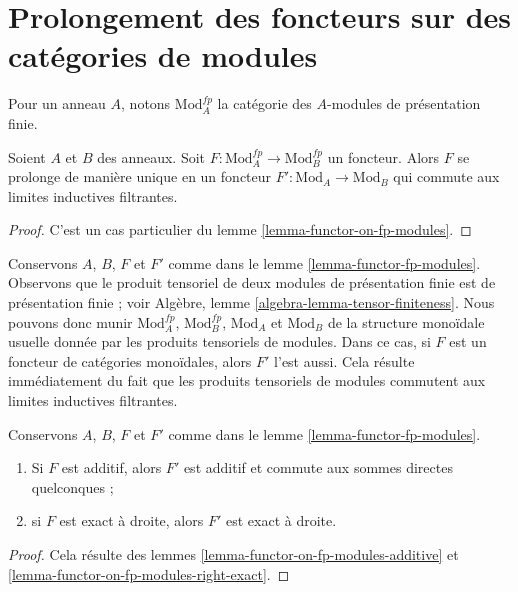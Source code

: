 \section{Prolongement des foncteurs sur des catégories de modules}
\label{section-functors-extend}

\noindent
Pour un anneau $A$, notons $\text{Mod}^{fp}_A$ la catégorie des
$A$-modules de présentation finie.

\begin{lemma}
\label{lemma-functor-fp-modules}
Soient $A$ et $B$ des anneaux. Soit
$F : \text{Mod}^{fp}_A \to \text{Mod}^{fp}_B$ un foncteur.
Alors $F$ se prolonge de manière unique en un foncteur
$F' : \text{Mod}_A \to \text{Mod}_B$
qui commute aux limites inductives filtrantes.
\end{lemma}

\begin{proof}
C'est un cas particulier du lemme \ref{lemma-functor-on-fp-modules}.
\end{proof}

\begin{remark}
\label{remark-monoidal-extension}
Conservons $A$, $B$, $F$ et $F'$ comme dans le lemme \ref{lemma-functor-fp-modules}.
Observons que le produit tensoriel de deux modules de présentation finie est
de présentation finie ; voir Algèbre, lemme \ref{algebra-lemma-tensor-finiteness}.
Nous pouvons donc munir $\text{Mod}^{fp}_A$, $\text{Mod}^{fp}_B$,
$\text{Mod}_A$ et $\text{Mod}_B$ de la structure monoïdale usuelle
donnée par les produits tensoriels de modules. Dans ce cas, si $F$ est
un foncteur de catégories monoïdales, alors $F'$ l'est aussi. Cela résulte immédiatement
du fait que les produits tensoriels de modules commutent aux limites inductives
filtrantes.
\end{remark}

\begin{lemma}
\label{lemma-functor-fp-modules-exact}
Conservons $A$, $B$, $F$ et $F'$ comme dans le lemme \ref{lemma-functor-fp-modules}.
\begin{enumerate}
\item Si $F$ est additif, alors $F'$ est additif et
commute aux sommes directes quelconques ;
\item si $F$ est exact à droite, alors $F'$ est exact à droite.
\end{enumerate}
\end{lemma}

\begin{proof}
Cela résulte des lemmes \ref{lemma-functor-on-fp-modules-additive} et
\ref{lemma-functor-on-fp-modules-right-exact}.
\end{proof}

